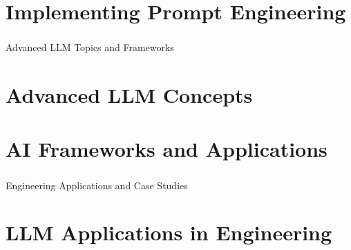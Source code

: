 \section[Day 11 Lab]{Implementing Prompt Engineering}






\begin{frame}[fragile]\frametitle{}
\begin{center}
{\Large Advanced LLM Topics and Frameworks}
\end{center}
\end{frame}

\section[Day 12 Theory]{Advanced LLM Concepts}







\section[Day 12 Lab]{AI Frameworks and Applications}












\begin{frame}[fragile]\frametitle{}
\begin{center}
{\Large Engineering Applications and Case Studies}
\end{center}
\end{frame}

\section[Applications]{LLM Applications in Engineering}










